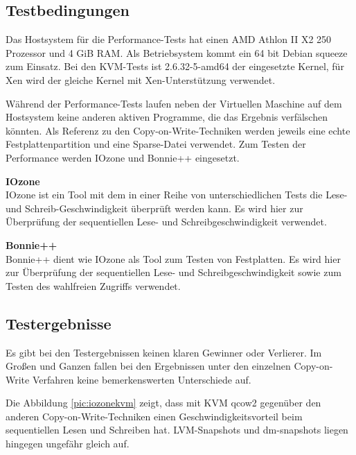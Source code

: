 \subsection{Testbedingungen}
Das Hostsystem für die Performance-Tests hat einen AMD Athlon II X2 250 Prozessor und 4 GiB RAM. Als Betriebsystem kommt ein 64 bit Debian squeeze zum Einsatz. Bei den KVM-Tests ist 2.6.32-5-amd64 der eingesetzte Kernel, für Xen wird der gleiche Kernel mit Xen-Unterstützung verwendet.

Während der Performance-Tests laufen neben der Virtuellen Maschine auf dem Hostsystem keine anderen aktiven Programme, die das Ergebnis verfälschen könnten. Als Referenz zu den Copy-on-Write-Techniken werden jeweils eine echte Festplattenpartition und eine Sparse-Datei verwendet. Zum Testen der Performance werden IOzone und Bonnie++ eingesetzt.

\textbf{IOzone} \\
IOzone ist ein Tool mit dem in einer Reihe von unterschiedlichen Tests die Lese- und Schreib-Geschwindigkeit überprüft werden kann. Es wird hier zur Überprüfung der sequentiellen Lese- und Schreibgeschwindigkeit verwendet.

\textbf{Bonnie++} \\
Bonnie++ dient wie IOzone als Tool zum Testen von Festplatten. Es wird hier zur Überprüfung der sequentiellen Lese- und Schreibgeschwindigkeit sowie zum Testen des wahlfreien Zugriffs verwendet.

\subsection{Testergebnisse}
Es gibt bei den Testergebnissen keinen klaren Gewinner oder Verlierer. Im Großen und Ganzen fallen bei den Ergebnissen unter den einzelnen Copy-on-Write Verfahren keine bemerkenswerten Unterschiede auf.

\begin{comment} Bei dem Iozone-Test wurden Dateigrößen von 512 MB, 2 GB, 4 Gb und 8 GB verwendet. Für die Entscheidungsfindung wird jedoch nur der Test mit 8 GB Dateigröße herangezogen. \end{comment}

Die Abbildung \ref{pic:iozonekvm} zeigt, dass mit KVM qcow2 gegenüber den anderen Copy-on-Write-Techniken einen Geschwindigkeitsvorteil beim sequentiellen Lesen und Schreiben hat. LVM-Snapshots und dm-snapshots liegen hingegen ungefähr gleich auf.


